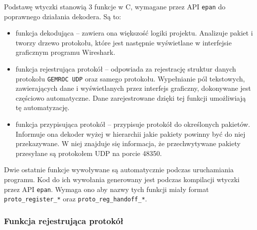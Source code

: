 \documentclass[a4paper, 12pt, twoside, openright]{article}
\begin{document}
	\indent\par
	Podstawę wtyczki stanowią 3 funkcje w C, wymagane przez API \texttt{epan} do poprawnego działania dekodera. Są to:
	\begin{itemize}
		\item funkcja dekodująca -- zawiera ona większość logiki projektu. Analizuje pakiet i tworzy drzewo protokołu,
			które jest następnie wyświetlane w interfejsie graficznym programu Wireshark.
		\item funkcja rejestrująca protokół -- odpowiada za rejestrację struktur danych protokołu \texttt{GEMROC UDP} oraz
			samego protokołu. Wypełnianie pól tekstowych, zawierających dane i wyświetlanych przez interfejs graficzny,
			dokonywane jest częściowo automatyczne. Dane zarejestrowane dzięki tej funkcji umożliwiają tę automatyzację.
		\item funkcja przypisująca protokół -- przypisuje protokół do określonych pakietów. Informuje ona dekoder wyżej
			w hierarchii jakie pakiety powinny być do niej przekazywane. W niej znajduje się informacja, że przechwytywane pakiety
			przesyłane są protokołem UDP na porcie 48350.
	\end{itemize}

	Dwie ostatnie funkcje wywoływane są automatycznie podczas uruchamiania programu. Kod do ich wywołania generowany jest
	podczas kompilacji wtyczki przez API \texttt{epan}. Wymaga ono aby nazwy tych funkcji miały format \texttt{proto\_register\_*} oraz
	\texttt{proto\_reg\_handoff\_*}.

	\subsubsection{Funkcja rejestrująca protokół}
\end{document}
